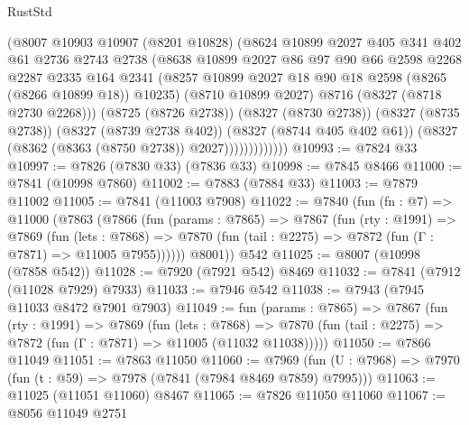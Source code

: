 \begin{lexlean}{RustStd}
\begin{coremodule}
{\begin{coremodule}
{{{{{{{{{{{{{{{{{{{{{{{{{{{{{{{{{{{{{{{{{{{{{{{{{{{{{{                      (@8007
                        @10903
                        @10907
                        (@8201 @10828)
                        (@8624
                          @10899
                          @2027
                          @405
                          @341
                          @402
                          @61
                          @2736
                          @2743
                          @2738
                          (@8638
                            @10899
                            @2027
                            @86
                            @97
                            @90
                            @66
                            @2598
                            @2268
                            @2287
                            @2335
                            @164
                            @2341
                            (@8257 @10899 @2027 @18 @90 @18 @2598 (@8265 (@8266 @10899 @18)) @10235)
                            (@8710 @10899 @2027)
                            @8716
                            (@8327 (@8718 @2730 @2268)))
                          (@8725 (@8726 @2738))
                          (@8327 (@8730 @2738))
                          (@8327 (@8735 @2738))
                          (@8327 (@8739 @2738 @402))
                          (@8327 (@8744 @405 @402 @61))
                          (@8327 (@8362 (@8363 (@8750 @2738)) @2027)))))))))))))
@10993 := @7824 @33
@10997 := @7826 (@7830 @33) (@7836 @33)
@10998 := @7845 @8466
@11000 := @7841 (@10998 @7860)
@11002 := @7883 (@7884 @33)
@11003 := @7879 @11002
@11005 := @7841 (@11003 @7908)
@11022 := @7840
    (fun (fn : @7) =>
    @11000
      (@7863
        (@7866
          (fun (params : @7865) =>
          @7867
            (fun (rty : @1991) =>
            @7869
              (fun (lets : @7868) =>
              @7870 (fun (tail : @2275) => @7872 (fun (Γ : @7871) => @11005 @7955))))))
        @8001))
    @542
@11025 := @8007 (@10998 (@7858 @542))
@11028 := @7920 (@7921 @542) @8469
@11032 := @7841 (@7912 (@11028 @7929) @7933)
@11033 := @7946 @542
@11038 := @7943 (@7945 @11033 @8472 @7901 @7903)
@11049 := fun (params : @7865) =>
  @7867
    (fun (rty : @1991) =>
    @7869
      (fun (lets : @7868) =>
      @7870 (fun (tail : @2275) => @7872 (fun (Γ : @7871) => @11005 (@11032 @11038)))))
@11050 := @7866 @11049
@11051 := @7863 @11050
@11060 := @7969
    (fun (U : @7968) => @7970 (fun (t : @59) => @7978 (@7841 (@7984 @8469 @7859) @7995)))
@11063 := @11025 (@11051 @11060) @8467
@11065 := @7826 @11050 @11060
@11067 := @8056 @11049 @2751
}}}}}}}}}}}}}}}}}}}}}}}}}}}}}}}}}}}}}}}}}}}}}}}}}}}}}}
\end{coremodule}}
\end{coremodule}
\end{lexlean}
